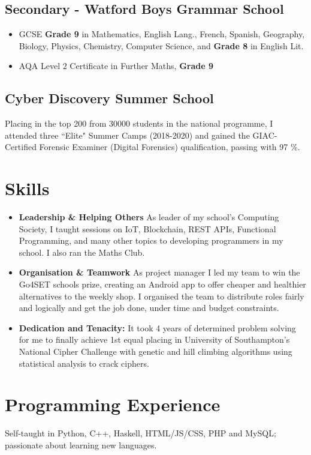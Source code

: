 \documentclass{Resume}
\begin{document}
		\subsection{Secondary - Watford Boys Grammar School}
				\begin{itemize}
					\item GCSE \textbf{Grade 9} in Mathematics, English Lang., French, Spanish, Geography, Biology, Physics, Chemistry, Computer Science, and \textbf{Grade 8} in English Lit.
					\item AQA Level 2 Certificate in Further Maths, \textbf{Grade 9}
				\end{itemize}
		\subsection{Cyber Discovery Summer School}
				Placing in the top 200 from 30000 students in the national programme, I attended three ``Elite" Summer Camps (2018-2020) and gained the GIAC-Certified Forensic Examiner (Digital Forensics) qualification, passing with 97 \%.


	\section{Skills}
			\begin{itemize}
				\item \textbf{Leadership \& Helping Others} As leader of my school's Computing Society, I taught sessions on IoT, Blockchain, REST APIs, Functional Programming, and many other topics to developing programmers in my school. I also ran the Maths Club.
				\item \textbf{Organisation \& Teamwork} As project manager I led my team to win the Go4SET schools prize, creating an Android app to offer cheaper and healthier alternatives to the weekly shop. I organised the team to distribute roles fairly and logically and get the job done, under time and budget constraints.
				\item \textbf{Dedication and Tenacity:}  It took 4 years of determined problem solving for me to finally achieve 1st equal placing in University of Southampton's National Cipher Challenge with genetic and hill climbing algorithms using statistical analysis to crack ciphers.
			\end{itemize}		

		\newpage
	\section{Programming Experience}
			Self-taught in Python, C++, Haskell, HTML/JS/CSS, PHP and MySQL; passionate about learning new languages.
\end{document}
